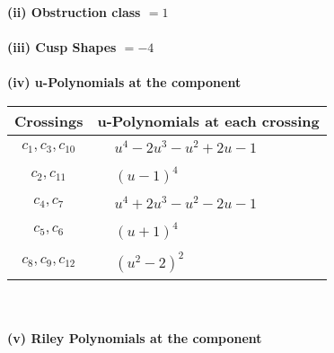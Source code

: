 \documentclass[1p]{elsarticle_modified}
\theoremstyle{definition}
\begin{document}
\flushleft \textbf{(ii) Obstruction class $= 1$}\\~\\
\flushleft \textbf{(iii) Cusp Shapes $= -4$}\\~\\
\newpage\renewcommand{\arraystretch}{1}
\flushleft \textbf{(iv) u-Polynomials at the component}\newline \\
\begin{tabular}{m{50pt}|m{274pt}}
Crossings & \hspace{64pt}u-Polynomials at each crossing \\
\hline $$\begin{aligned}c_{1},c_{3},c_{10}\end{aligned}$$&$\begin{aligned}
&u^4-2 u^3- u^2+2 u-1
\end{aligned}$\\
\hline $$\begin{aligned}c_{2},c_{11}\end{aligned}$$&$\begin{aligned}
&(u-1)^4
\end{aligned}$\\
\hline $$\begin{aligned}c_{4},c_{7}\end{aligned}$$&$\begin{aligned}
&u^4+2 u^3- u^2-2 u-1
\end{aligned}$\\
\hline $$\begin{aligned}c_{5},c_{6}\end{aligned}$$&$\begin{aligned}
&(u+1)^4
\end{aligned}$\\
\hline $$\begin{aligned}c_{8},c_{9},c_{12}\end{aligned}$$&$\begin{aligned}
&(u^2-2)^2
\end{aligned}$\\
\hline
\end{tabular}\\~\\
\newpage\renewcommand{\arraystretch}{1}
\flushleft \textbf{(v) Riley Polynomials at the component}\newline \\
\end{document}
